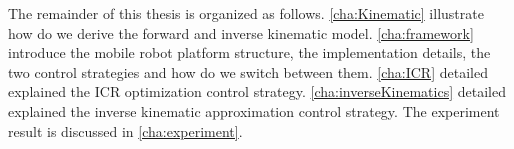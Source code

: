 The remainder of this thesis is organized as follows.
\cref{cha:Kinematic} illustrate how do we derive the forward and inverse kinematic model.
\cref{cha:framework} introduce the mobile robot platform structure, the implementation details, the two control strategies and how do we switch between them.
\cref{cha:ICR} detailed explained the ICR optimization control strategy.
\cref{cha:inverseKinematics} detailed explained the inverse kinematic approximation control strategy.
The experiment result is discussed in \cref{cha:experiment}.